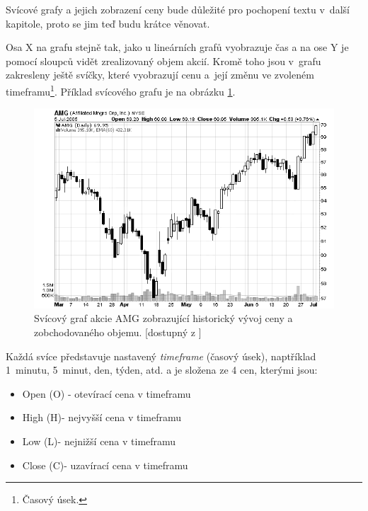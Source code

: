 \documentclass[thesis=M,czech]{FITthesis}[2012/06/26]
\begin{document}
	Svícové grafy a jejich zobrazení ceny bude důležité pro pochopení textu v~další kapitole, proto se jim teď budu krátce věnovat.
	
	Osa X na grafu stejně tak, jako u lineárních grafů vyobrazuje čas a na ose Y je pomocí sloupců vidět zrealizovaný objem akcií. Kromě toho jsou v~grafu zakresleny ještě svíčky, které vyobrazují cenu a~její změnu ve zvoleném timeframu\footnote{Časový úsek.}. Příklad svícového grafu je na obrázku \ref{fig:chart_candlestick}.	

\begin{figure}[h]
	\centering
	\includegraphics[width=1\textwidth]{images/candlechart}
 	\caption[Svícový graf zobrazující historický vývoj ceny a objemu]{Svícový graf akcie AMG zobrazující historický vývoj ceny a zobchodovaného objemu. [dostupný z \cite{CandleStickChart}]}
 	\label{fig:chart_candlestick} 	
\end{figure}
	
	Každá svíce představuje nastavený \textit{timeframe} (časový úsek), naptříklad 1~minutu, 5~minut, den, týden, atd. a je složena ze 4 cen, kterými jsou:
		
 \begin{itemize}

 	\item Open (O) - otevírací cena v timeframu

 	\item High (H)- nejvyšší cena v timeframu

 	\item Low (L)- nejnižší cena v timeframu

 	\item Close (C)- uzavírací cena v timeframu

\end{itemize}
		
\end{document}
